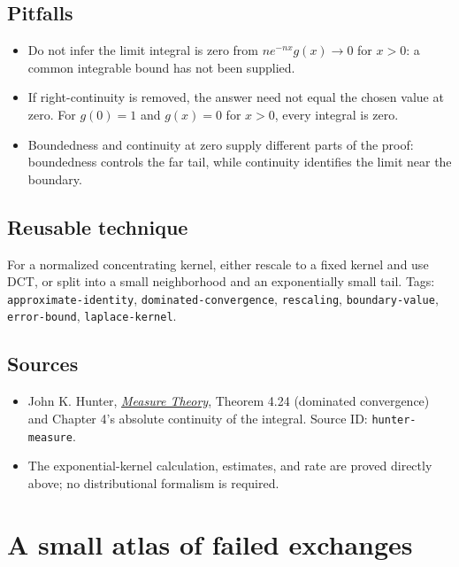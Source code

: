 \documentclass[
  11pt,
]{article}
\providecommand{\tightlist}{%
  \setlength{\itemsep}{0pt}\setlength{\parskip}{0pt}}
\begin{document}
\subsection{Pitfalls}\label{pitfalls-15}

\begin{itemize}
\tightlist
\item
  Do not infer the limit integral is zero from \(ne^{-nx}g(x)\to0\) for
  \(x>0\): a common integrable bound has not been supplied.
\item
  If right-continuity is removed, the answer need not equal the chosen
  value at zero. For \(g(0)=1\) and \(g(x)=0\) for \(x>0\), every
  integral is zero.
\item
  Boundedness and continuity at zero supply different parts of the
  proof: boundedness controls the far tail, while continuity identifies
  the limit near the boundary.
\end{itemize}

\subsection{Reusable technique}\label{reusable-technique-15}

For a normalized concentrating kernel, either rescale to a fixed kernel
and use DCT, or split into a small neighborhood and an exponentially
small tail. Tags: \texttt{approximate-\allowbreak{}identity},
\texttt{dominated-\allowbreak{}convergence}, \texttt{rescaling},
\texttt{boundary-\allowbreak{}value}, \texttt{error-\allowbreak{}bound}, \texttt{laplace-\allowbreak{}kernel}.

\subsection{Sources}\label{sources-15}

\begin{itemize}
\tightlist
\item
  John K. Hunter,
  \href{https://www.math.ucdavis.edu/~hunter/measure_theory/measure_notes.pdf}{\emph{Measure
  Theory}}, Theorem 4.24 (dominated convergence) and Chapter 4's
  absolute continuity of the integral. Source ID:
  \texttt{hunter-\allowbreak{}measure}.
\item
  The exponential-kernel calculation, estimates, and rate are proved
  directly above; no distributional formalism is required.
\end{itemize}

\section{A small atlas of failed exchanges}\label{atlas}
\end{document}
